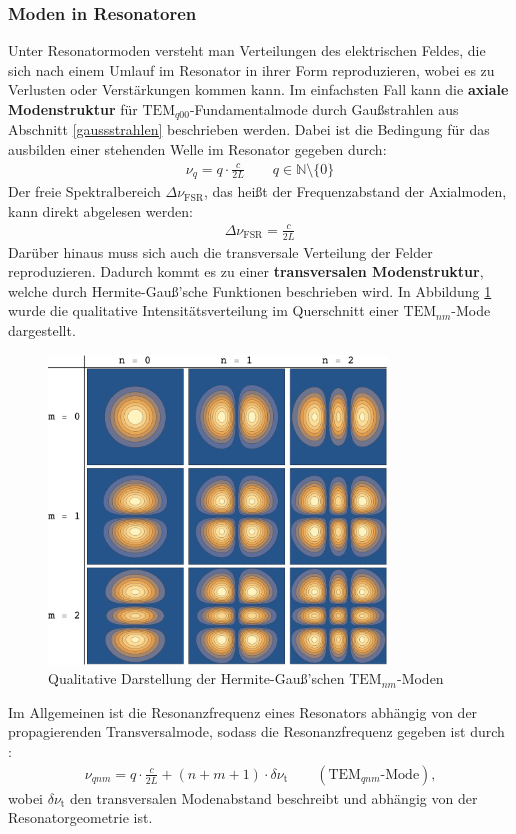 \documentclass[11pt, a4paper]{article}
\numberwithin{equation}{section}
\begin{document}
\subsubsection{Moden in Resonatoren}
Unter Resonatormoden versteht man Verteilungen des elektrischen Feldes, die sich nach einem Umlauf im Resonator in ihrer Form reproduzieren, wobei es zu Verlusten oder Verstärkungen kommen kann.
Im einfachsten Fall kann die \textbf{axiale Modenstruktur} für $\mathrm{TEM}_{q00}$-Fundamentalmode durch Gaußstrahlen aus Abschnitt \ref{gaussstrahlen} beschrieben werden.
Dabei ist die Bedingung für das ausbilden einer stehenden Welle im Resonator gegeben durch:
\begin{align}
	\nu_q = q \cdot \frac{c}{2 L} \qquad q \in \mathbb{N} \setminus \{0\}
\end{align}
Der freie Spektralbereich $\Delta \nu_\mathrm{FSR}$, das heißt der Frequenzabstand der Axialmoden, kann direkt abgelesen werden:
\begin{align}
	\Delta \nu_\mathrm{FSR} = \frac{c}{2 L}
	\label{eq:modenabstand}
\end{align}
Darüber hinaus muss sich auch die transversale Verteilung der Felder reproduzieren.
Dadurch kommt es zu einer \textbf{transversalen Modenstruktur}, welche durch Hermite-Gauß'sche Funktionen beschrieben wird.
In Abbildung \ref{fig:transversalmoden} wurde die qualitative Intensitätsverteilung im Querschnitt einer $\mathrm{TEM}_{nm}$-Mode dargestellt.
\begin{figure}[h]
	\centering
	\includegraphics[width=0.8\textwidth]{./figures/transversalmoden.png}
	\caption{Qualitative Darstellung der Hermite-Gauß'schen $\mathrm{TEM}_{nm}$-Moden}
	\label{fig:transversalmoden}
\end{figure}
Im Allgemeinen ist die Resonanzfrequenz eines Resonators abhängig von der propagierenden Transversalmode, sodass die Resonanzfrequenz gegeben ist durch \cite{siegman}:
\begin{align}
	\nu_{qnm} = q \cdot \frac{c}{2 L} + \left( n + m + 1 \right) \cdot \delta \nu_\mathrm{t} \qquad (\mathrm{TEM}_{qnm}\text{-Mode})\text{,}
\end{align}
wobei $\delta \nu_\mathrm{t}$ den transversalen Modenabstand beschreibt und abhängig von der Resonatorgeometrie ist.
\end{document}
